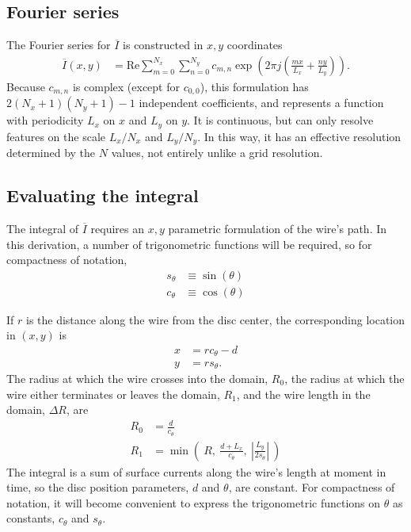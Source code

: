 \documentclass{article}
\def\I{\overline{I}}
\def\real{\mathrm{Re}}
\begin{document}
\subsection{Fourier series}

The Fourier series for $\I$ is constructed in $x,y$ coordinates
\begin{align}
\I(x,y) &= \real \sum_{m=0}^{N_x} \sum_{n=0}^{N_y} c_{m,n} \exp\left(2\pi j \left(\frac{mx}{L_x} + \frac{ny}{L_y}\right)\right).
\end{align}
Because $c_{m,n}$ is complex (except for $c_{0,0}$), this formulation has $2(N_x+1)(N_y+1)-1$ independent coefficients, and represents a function with periodicity $L_x$ on $x$ and $L_y$ on $y$.  It is continuous, but can only resolve features on the scale $L_x / N_x$ and $L_y / N_y$.  In this way, it has an effective resolution determined by the $N$ values, not entirely unlike a grid resolution.

\subsection{Evaluating the integral}

The integral of $\I$ requires an $x,y$ parametric formulation of the wire's path.  In this derivation, a number of trigonometric functions will be required, so for compactness of notation, 
\begin{align}
s_\theta &\equiv \sin(\theta)\\
c_\theta &\equiv \cos(\theta)
\end{align}

If $r$ is the distance along the wire from the disc center, the corresponding location in $(x,y)$ is
\begin{align}
x &= r c_\theta - d\\
y &= r s_\theta.
\end{align}
The radius at which the wire crosses into the domain, $R_0$, the radius at which the wire either terminates or leaves the domain, $R_1$, and the wire length in the domain, $\Delta R$, are
\begin{align}
R_0 &= \frac{d}{c_\theta}\\
R_1 &= \min\left(\ R,\ \frac{d + L_x}{c_\theta},\ \left|\frac{L_y}{2s_\theta}\right|\ \right)
\end{align}
The integral is a sum of surface currents along the wire's length at moment in time, so the disc position parameters, $d$ and $\theta$, are constant.  For compactness of notation, it will become convenient to express the trigonometric functions on $\theta$ as constants, $c_\theta$ and $s_\theta$.
\end{document}
